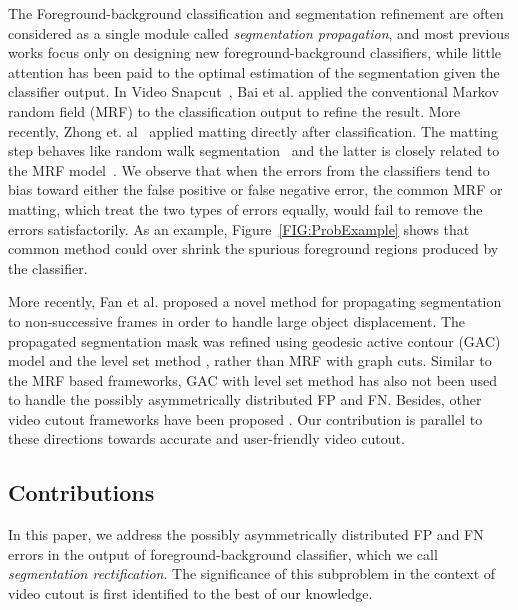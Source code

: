 \documentclass[10pt,journal,compsoc]{newIEEEtran}
\begin{document}
The Foreground-background classification and segmentation refinement are often considered as a single module called \emph{segmentation propagation}, and most previous works focus only on designing new foreground-background classifiers, while little attention has been paid to the optimal estimation of the segmentation given the classifier output. In Video Snapcut~\cite{Bai09VideoSnapCut_SIGGRAPH}, Bai et al. applied the conventional Markov random field (MRF) to the classification output to refine the result. More recently, Zhong et. al~\cite{Zhong2012UDC_SIGGRAPHAsia} applied matting directly after classification. The matting step behaves like random walk segmentation~\cite{grady2006random} and the latter is closely related to the MRF model~\cite{Sinop2007seeded}. We observe that when the errors from the classifiers tend to bias toward either the false positive or false negative error, the common MRF or matting, which treat the two types of errors equally, would fail to remove the errors satisfactorily. As an example, Figure~\ref{FIG:ProbExample} shows that common method could over shrink the spurious foreground regions produced by the classifier. 

More recently, Fan et al.\cite{Fan2015JumpCut} proposed a novel method for propagating segmentation to non-successive frames in order to handle large object displacement. The propagated segmentation mask was refined using geodesic active contour (GAC) model \cite{Caselles97GAC} and the level set method \cite{OsherSethian88Fronts}, rather than MRF with graph cuts. Similar to the MRF based frameworks, GAC with level set method has also not been used to handle the possibly asymmetrically distributed FP and FN. Besides, other video cutout frameworks have been proposed \cite{Tong2011video,FuHongbo2012EXCOL,zhang2015efficient}. Our contribution is parallel to these directions towards accurate and user-friendly video cutout. 

\subsection{Contributions}
In this paper, we address the possibly asymmetrically distributed FP and FN errors in the output of foreground-background classifier, which we call {\em segmentation rectification}. The significance of this subproblem in the context of video cutout is first identified to the best of our knowledge. 
\end{document}
